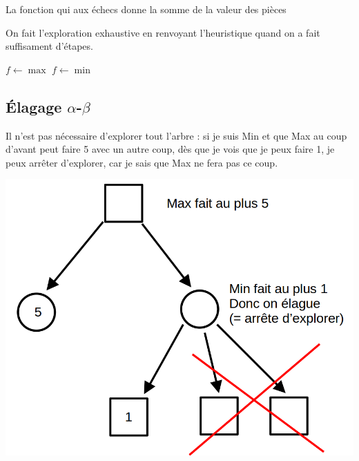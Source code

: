 \begin{example}
	La fonction qui aux échecs donne la somme de la valeur des pièces
\end{example}

\begin{idee}
	On fait l'exploration exhaustive en renvoyant l'heuristique quand on a fait suffisament d'étapes.
\end{idee}

\begin{algorithm}[H]
	\caption{$MinMax(j, prof, u)$}
		{}
		{$f\gets \max$}
		{$f \gets\min$}
\end{algorithm}

\subsection{Élagage $\alpha$-$\beta$}

\begin{minipage}{0.5\linewidth}
	\begin{idee}
		Il n'est pas nécessaire d'explorer tout l'arbre : si je suis Min et que Max au coup d'avant peut faire 5 avec un autre coup, dès que je vois que je peux faire 1, je peux arrêter d'explorer, car je sais que Max ne fera pas ce coup.
	\end{idee}
\end{minipage} \quad \begin{minipage}{0.4\linewidth}
	\includegraphics[width=\linewidth]{lecon/16-jeu/alpha_beta.png}
\end{minipage}

